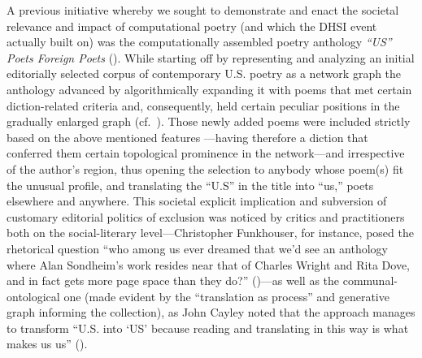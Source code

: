 A previous initiative whereby we sought to demonstrate and enact the
societal relevance and impact of computational poetry (and which the
DHSI event actually built on) was the computationally assembled poetry
anthology \emph{``US'' Poets Foreign Poets} (\cite{margento2018us}).
While starting off by representing and analyzing an initial editorially
selected corpus of contemporary U.S. poetry as a network graph the
anthology advanced by algorithmically expanding it with poems that met
certain diction-related criteria and, consequently, held certain
peculiar positions in the gradually enlarged graph
(cf.~\cite{margento2019us}). Those newly added poems were included
strictly based on the above mentioned features ---having therefore a
diction that conferred them certain topological prominence in the
network---and irrespective of the author's region, thus opening the
selection to anybody whose poem(s) fit the unusual profile, and
translating the ``U.S'' in the title into ``us,'' poets elsewhere and
anywhere. This societal explicit implication and subversion of customary
editorial politics of exclusion was noticed by critics and practitioners
both on the social-literary level---Christopher Funkhouser, for
instance, posed the rhetorical question ``{w}ho among us ever
dreamed that we'd see an anthology where Alan Sondheim's work resides
near that of Charles Wright and Rita Dove, and in fact gets more page
space than they do?'' (\cite{funkhouser2019margento})---as well as the
communal-ontological one (made evident by the ``translation as process''
and generative graph informing the collection), as John Cayley noted
that the approach manages to transform ``U.S. into `US' because reading
and translating in this way is what makes us us''
(\cite{cayley2019ifiam}).

